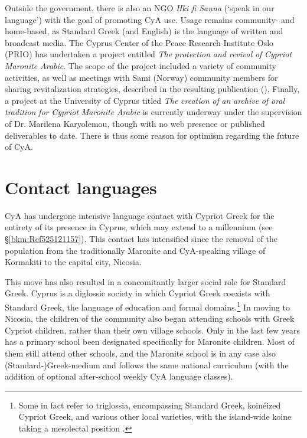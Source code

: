 \documentclass[output=paper]{langsci/langscibook}
\begin{document}
Outside the government, there is also an NGO \textit{Hki fi Sanna} (‘speak in our language’) with the goal of promoting CyA use. Usage remains community- and home-based, as Standard Greek (and English) is the language of written and broadcast media. The Cyprus Center of the Peace Research Institute Oslo (PRIO) has undertaken a project entitled \textit{The} \textit{protection} \textit{and} \textit{revival} \textit{of} \textit{Cypriot} \textit{Maronite} \textit{Arabic}. The scope of the project included a variety of community activities, as well as meetings with Sami (Norway) community members for sharing revitalization strategies, described in the resulting publication (\citealt{PRIO2009}). Finally, a project at the University of Cyprus titled \textit{The} \textit{creation} \textit{of} \textit{an} \textit{archive} \textit{of} \textit{oral} \textit{tradition} \textit{for} \textit{Cypriot} \textit{Maronite} \textit{Arabic} is currently underway under the supervision of Dr. Marilena Karyolemou, though with no web presence or published deliverables to date. There is thus some reason for optimism regarding the future of CyA.

\section{\label{bkm:Ref525122525}Contact languages}

CyA has undergone intensive language contact with Cypriot Greek for the entirety of its presence in Cyprus, which may extend to a millennium (see §\ref{bkm:Ref525121157}). This contact has intensified since the removal of the population from the traditionally Maronite and CyA-speaking village of Kormakiti to the capital city, Nicosia. 

This move has also resulted in a concomitantly larger social role for Standard Greek. Cyprus is a diglossic society in which Cypriot Greek coexists with Standard Greek, the language of education and formal domains.\footnote{Some in fact refer to triglossia, encompassing Standard Greek, koinéized Cypriot Greek, and various other local varieties, with the island-wide koine taking a mesolectal position \citep{Arvaniti2010}.} In moving to Nicosia, the children of the community also began attending schools with Greek Cypriot children, rather than their own village schools. Only in the last few years has a primary school been designated specifically for Maronite children. Most of them still attend other schools, and the Maronite school is in any case also (Standard-)Greek-medium and follows the same national curriculum (with the addition of optional after-school weekly CyA language classes).
\end{document}
